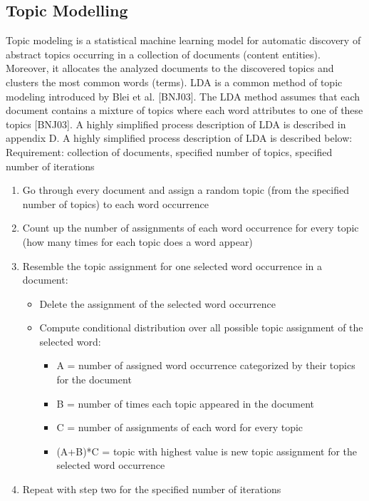 \subsection{Topic Modelling}
\label{subsec:topic-modelling}
Topic modeling is a statistical machine learning model for automatic discovery of abstract topics occurring in a collection of documents (content entities). Moreover, it allocates the analyzed documents to the discovered topics and clusters the most common words (terms). \acf{LDA} is a common method of topic modeling introduced by Blei et al. [BNJ03]. The \ac{LDA} method assumes that each document contains a mixture of topics where each word attributes to one of these topics [BNJ03]. A highly simplified process description of \ac{LDA} is described in appendix D.
A highly simplified process description of LDA is described below:
Requirement: collection of documents, specified number of topics, specified number of iterations
\begin{enumerate}
  \item{Go through every document and assign a random topic (from the specified number of topics) to each word occurrence}
  \item{Count up the number of assignments of each word occurrence for every topic (how many times for each topic does a word appear)}
  \item{Resemble the topic assignment for one selected word occurrence in a document:}
  \begin{itemize}
    \item{Delete the assignment of the selected word occurrence}
    \item{Compute conditional distribution over all possible topic assignment of the selected word:}
    \begin{itemize}
      \item{A = number of assigned word occurrence categorized by their topics for the document}
      \item{B = number of times each topic appeared in the document}
      \item{C = number of assignments of each word for every topic}
      \item{(A+B)*C = topic with highest value is new topic assignment for the selected word occurrence}
    \end{itemize}
  \end{itemize}
  \item{Repeat with step two for the specified number of iterations}
\end{enumerate}


